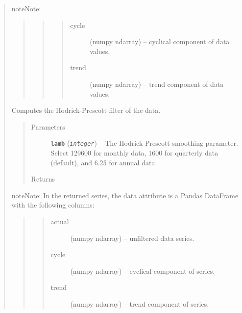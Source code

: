 \documentclass[letterpaper,10pt,english]{sphinxmanual}
\begin{document}
\begin{fulllineitems}
\begin{quote}
\begin{fulllineitems}
\begin{notice}{note}{Note:}
\begin{quote}
\begin{quote}
\begin{description}
\begin{quote}
\begin{description}
\item[{cycle}] \leavevmode
(numpy ndarray) --  cyclical component of data values.

\item[{trend}] \leavevmode
(numpy ndarray) --  trend component of data values.

\end{description}\end{quote}

\end{description}\end{quote}
\end{quote}
\end{notice}

\end{fulllineitems}


\begin{fulllineitems}
\label{series_class:fredpy.series.hpfilter}
Computes the Hodrick-Prescott filter of the data.
\begin{quote}\begin{description}
\item[{Parameters}] \leavevmode
\textbf{\texttt{lamb}} (\emph{\texttt{integer}}) -- The Hodrick-Prescott smoothing parameter. Select 129600 for monthly data, 1600 for quarterly data (default), and 6.25 for annual data.

\item[{Returns}] \leavevmode
{\hyperref[series_class:fredpy.series]{}}

\end{description}\end{quote}

\begin{notice}{note}{Note:}
In the returned series, the data attribute is a Pandas DataFrame with the following columns:
\begin{quote}
\begin{quote}\begin{description}
\item[{actual}] \leavevmode
(numpy ndarray) --  unfiltered data series.

\item[{cycle}] \leavevmode
(numpy ndarray) --  cyclical component of series.

\item[{trend}] \leavevmode
(numpy ndarray) --  trend component of series.


\end{description}
\end{quote}
\end{quote}
\end{notice}
\end{fulllineitems}
\end{quote}
\end{fulllineitems}
\end{document}
